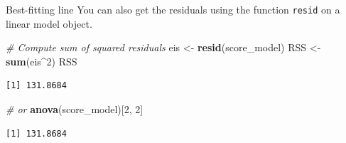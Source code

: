 \documentclass[
  ignorenonframetext,
]{beamer}
\newenvironment{Shaded}{\begin{snugshade}}{\end{snugshade}}
\newcommand{\CommentTok}[1]{\textcolor[rgb]{0.56,0.35,0.01}{\textit{#1}}}
\newcommand{\DecValTok}[1]{\textcolor[rgb]{0.00,0.00,0.81}{#1}}
\newcommand{\FunctionTok}[1]{\textcolor[rgb]{0.13,0.29,0.53}{\textbf{#1}}}
\newcommand{\NormalTok}[1]{#1}
\newcommand{\OtherTok}[1]{\textcolor[rgb]{0.56,0.35,0.01}{#1}}
\newcommand{\SpecialCharTok}[1]{\textcolor[rgb]{0.81,0.36,0.00}{\textbf{#1}}}
\begin{document}
\begin{frame}[fragile]{Best-fitting line}
\protect{}\label{best-fitting-line-4}
You can also get the residuals using the function \texttt{resid} on a
linear model object.

\normalsize

\begin{Shaded}
\begin{Highlighting}[]
\CommentTok{\# Compute sum of squared residuals}
\NormalTok{eis }\OtherTok{\textless{}{-}} \FunctionTok{resid}\NormalTok{(score\_model)}
\NormalTok{RSS }\OtherTok{\textless{}{-}} \FunctionTok{sum}\NormalTok{(eis}\SpecialCharTok{\^{}}\DecValTok{2}\NormalTok{)}
\NormalTok{RSS}
\end{Highlighting}
\end{Shaded}

\begin{verbatim}
[1] 131.8684
\end{verbatim}

\begin{Shaded}
\begin{Highlighting}[]
\CommentTok{\# or}
\FunctionTok{anova}\NormalTok{(score\_model)[}\DecValTok{2}\NormalTok{, }\DecValTok{2}\NormalTok{]}
\end{Highlighting}
\end{Shaded}

\begin{verbatim}
[1] 131.8684
\end{verbatim}

\normalsize
\end{frame}
\end{document}
